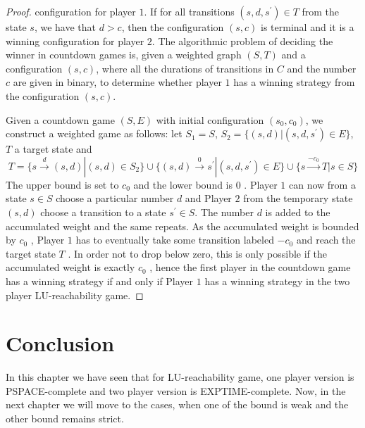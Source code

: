 \begin{proof}
configuration for player $1$. If for all transitions $(s, d, s^{\prime}) \in T$ from the state $s$, we have
that $d > c$, then the configuration $(s, c)$ is terminal and it is a winning configuration for player $2$. The algorithmic problem of deciding the winner in countdown games is, given a weighted graph $(S, T)$ and a configuration $(s, c)$, where all the durations of transitions in $C$ and the number $c$ are given in binary, to determine whether player $1$ has a winning
strategy from the configuration $(s, c)$.

Given a countdown game $(S, E)$ with initial configuration $(s_0 , c_0)$, we construct a weighted game as follows: let $S_1 = S$, $S_2 = \{(s, d) | (s, d, s^{\prime}) \in E\}$, $T$ a target state and  
$$
T= \{s\xrightarrow{d}(s,d)|(s,d)\in S_2\}\cup \{(s,d)\xrightarrow{0} s^{\prime}| (s,d,s^{\prime}) \in E\}\cup \{s \xrightarrow{-c_0}T|s \in S\}
$$
The upper bound is set to $c_0$ and the lower bound is $0$ . Player $1$ can now from a state $s \in S$ choose a particular number $d$ and Player $2$ from the temporary state $(s, d)$ choose a transition to a state $s^{\prime} \in S$. The number $d$ is added to the accumulated weight and the same repeats. As the accumulated weight is bounded by $c_0$ , Player $1$ has to eventually take some transition labeled $- c_0$ and reach the target state $T$ . In order not to drop below zero, this is only possible if the accumulated weight is exactly $c_0$ , hence the first player in the countdown game has a winning strategy if and only if Player $1$ has a winning strategy in the two player LU-reachability game.
\end{proof}

\section{Conclusion}
In this chapter we have seen that for LU-reachability game, one player version is PSPACE-complete and two player version is EXPTIME-complete. Now, in the next chapter we will move to the cases, when one of the bound is weak and the other bound remains strict.